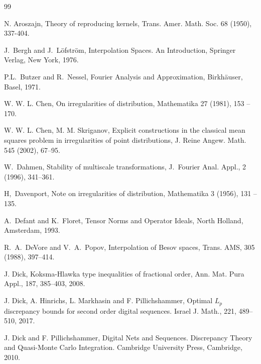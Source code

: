 \documentclass[12pt]{article}
\newcommand{\LL}{\mathcal{L}}
\begin{document}
\footnotesize{
\begin{thebibliography}{99}

   N. Aroszajn, 
   Theory of reproducing kernels,
   Trans. Amer. Math. Soc. 68 (1950), 337-404.

{J.~Bergh and J.~L\"ofstr\"om}, Interpolation Spaces. An Introduction, Springer Verlag, New York, 1976.

{P.L.~Butzer and R.~Nessel}, Fourier Analysis and Approximation, Birkh\"auser, Basel, 1971.

W. W. L. Chen, On irregularities of distribution, Mathematika 27 (1981), 153 -- 170.

W. W. L. Chen, M. M. Skriganov,  Explicit constructions in the classical mean squares problem in irregularities of point distributions, J. Reine Angew. Math. 545 (2002), 67--95.



 W.~Dahmen, Stability of multiscale transformations,
J.~Fourier Anal. Appl., 2 (1996), 341--361.

H,~Davenport, Note on irregularities of distribution, Mathematika 3 (1956),
131 -- 135.

{A.~Defant and K.~Floret},
{Tensor Norms and Operator Ideals}, North Holland, Amsterdam, 1993.

 R.~A.~DeVore and V.~A.~Popov, Interpolation of Besov spaces,
Trans. AMS, 305 (1988), 397--414.

 J. Dick, Koksma-Hlawka type inequalities of fractional order,  Ann. Mat. Pura Appl., 187,  385--403, 2008.

 J. Dick, A. Hinrichs, L. Markhasin and F. Pillichshammer, Optimal $L_p$ discrepancy bounds for second order digital sequences. Israel J. Math., 221, 489--510, 2017.

 J. Dick and F. Pillichshammer, Digital Nets and Sequences. Discrepancy Theory 
and Quasi-Monte Carlo Integration. Cambridge University Press, Cambridge, 2010.



\end{thebibliography}}
\end{document}

